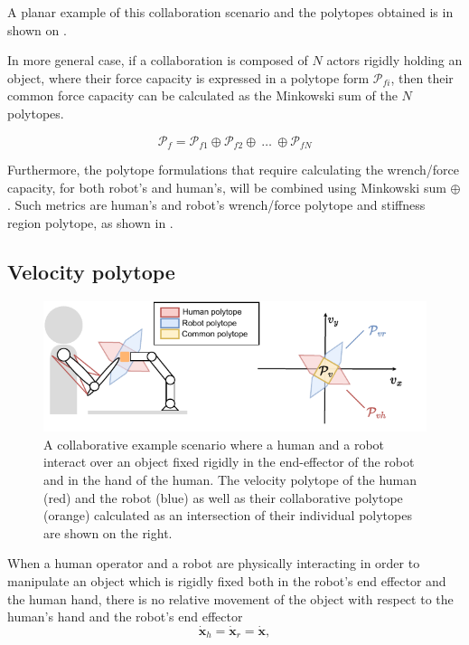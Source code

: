 A planar example of this collaboration scenario and the polytopes obtained is in shown on . 

In more general case, if a collaboration is composed of $N$ actors rigidly holding an object, where their force capacity is expressed in a polytope form $\mathcal{P}_{fi}$, then their common force capacity can be calculated as the Minkowski sum of the $N$ polytopes.

\begin{equation}
    \mathcal{P}_f =  \mathcal{P}_{f1} \oplus \mathcal{P}_{f2} \oplus ~\ldots ~\oplus  \mathcal{P}_{fN}
\end{equation}

Furthermore, the polytope formulations that require calculating the wrench/force capacity, for both robot's and human's, will be combined using Minkowski sum $\oplus$. Such metrics are human's and robot's wrench/force polytope and stiffness region polytope, as shown in .

\subsection{Velocity polytope}
\label{ch:velocity_collab}

\begin{figure}[!h]
    \centering
    \includegraphics[width=0.7\linewidth]{Chapters/imgs/velocity_collab.pdf}
    \caption{A collaborative example scenario where a human and a robot interact over an object fixed rigidly in the end-effector of the robot and in the hand of the human. The velocity polytope of the human (red) and the robot (blue) as well as their collaborative polytope (orange) calculated as an intersection of their individual polytopes are shown on the right.}
    \label{fig:collaboration_vel}
\end{figure}

When a human operator and a robot are physically interacting in order to manipulate an object which is rigidly fixed both in the robot's end effector and the human hand, there is no relative movement of the object with respect to the human's hand and the robot's end effector
\begin{equation}
    \dot{\bm{x}}_h=\dot{\bm{x}}_r=\dot{\bm{x}},
\end{equation}

